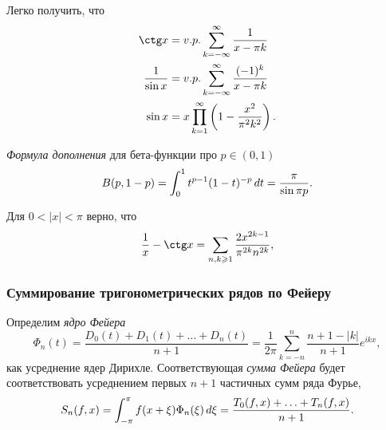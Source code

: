 \begin{to_lem}
     Легко получить, что
    \begin{align*}
        \ctg x
        &=
        v. p. \sum_{k=-\infty}^{\infty} \frac{1}{x-\pi k} \\
        \frac{1}{\sin x}
        &=
         v. p. \sum_{k=-\infty}^{\infty} \frac{(-1)^k}{x-\pi k} \\
        \sin x
        &=
        x \prod_{k=1}^{\infty} \left(
            1 - \frac{x^2}{\pi^2 k^2}
        \right).
    \end{align*}
\end{to_lem}


\begin{to_lem}
    \textit{Формула дополнения} для бета-функции про $p \in (0, 1)$
    \begin{equation*}
        B(p, 1-p) = \int_0^1 t^{p-1} (1-t)^{-p} \, d t = \frac{\pi}{\sin \pi p}.
    \end{equation*}
\end{to_lem}

\begin{to_lem}
    Для $0 < |x| < \pi$ верно, что
    \begin{equation*}
        \frac{1}{x} - \ctg x = 
        \sum_{n, k \geq 1} \frac{2 x^{2k-1}}{\pi^{2k} n^{2k}},
    \end{equation*}
\end{to_lem}


\subsubsection*{Суммирование тригонометрических рядов по Фейеру}


\begin{to_def}
    Определим \textit{ядро Фейера} 
    \begin{equation*}
        \Phi_n (t) = 
        \frac{D_0 (t) + D_1 (t) + \ldots + D_n (t)}{n+1} = 
        \frac{1}{2\pi} \sum_{k=-n}^{n} 
        \frac{n+1 - |k|}{n+1} e^{ikx},
    \end{equation*}
    как усреднение ядер Дирихле. Соответствующая \textit{сумма Фейера} будет соответствовать усреднением первых $n+1$ частичных сумм ряда Фурье,
    \begin{equation*}
        S_n (f, x) = \int_{-\pi}^{\pi} 
        f(x+\xi) \Phi_n (\xi) \, d \xi = 
        \frac{T_0 (f, x) + \ldots + T_n (f, x)}{n+1}.
    \end{equation*}
\end{to_def}

